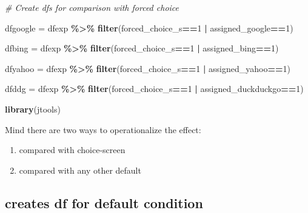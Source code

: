 \documentclass[
  11pt,
]{article}
\newenvironment{Shaded}{\begin{snugshade}}{\end{snugshade}}
\newcommand{\CommentTok}[1]{\textcolor[rgb]{0.56,0.35,0.01}{\textit{#1}}}
\newcommand{\DecValTok}[1]{\textcolor[rgb]{0.00,0.00,0.81}{#1}}
\newcommand{\FunctionTok}[1]{\textcolor[rgb]{0.13,0.29,0.53}{\textbf{#1}}}
\newcommand{\NormalTok}[1]{#1}
\newcommand{\OtherTok}[1]{\textcolor[rgb]{0.56,0.35,0.01}{#1}}
\newcommand{\SpecialCharTok}[1]{\textcolor[rgb]{0.81,0.36,0.00}{\textbf{#1}}}
\begin{document}
\begin{Shaded}
\begin{Highlighting}[]
\CommentTok{\# Create dfs for comparison with forced choice}

\NormalTok{dfgoogle }\OtherTok{=}\NormalTok{ dfexp }\SpecialCharTok{\%\textgreater{}\%} 
  \FunctionTok{filter}\NormalTok{(forced\_choice\_s}\SpecialCharTok{==}\DecValTok{1} \SpecialCharTok{|}\NormalTok{ assigned\_google}\SpecialCharTok{==}\DecValTok{1}\NormalTok{) }

\NormalTok{dfbing }\OtherTok{=}\NormalTok{ dfexp }\SpecialCharTok{\%\textgreater{}\%} 
  \FunctionTok{filter}\NormalTok{(forced\_choice\_s}\SpecialCharTok{==}\DecValTok{1} \SpecialCharTok{|}\NormalTok{ assigned\_bing}\SpecialCharTok{==}\DecValTok{1}\NormalTok{) }

\NormalTok{dfyahoo }\OtherTok{=}\NormalTok{ dfexp }\SpecialCharTok{\%\textgreater{}\%} 
  \FunctionTok{filter}\NormalTok{(forced\_choice\_s}\SpecialCharTok{==}\DecValTok{1} \SpecialCharTok{|}\NormalTok{ assigned\_yahoo}\SpecialCharTok{==}\DecValTok{1}\NormalTok{) }

\NormalTok{dfddg }\OtherTok{=}\NormalTok{ dfexp }\SpecialCharTok{\%\textgreater{}\%} 
  \FunctionTok{filter}\NormalTok{(forced\_choice\_s}\SpecialCharTok{==}\DecValTok{1} \SpecialCharTok{|}\NormalTok{ assigned\_duckduckgo}\SpecialCharTok{==}\DecValTok{1}\NormalTok{) }
\end{Highlighting}
\end{Shaded}

\begin{Shaded}
\begin{Highlighting}[]
\FunctionTok{library}\NormalTok{(jtools)}
\end{Highlighting}
\end{Shaded}

Mind there are two ways to operationalize the effect:

\begin{enumerate}
\def\labelenumi{\arabic{enumi})}
\item
  compared with choice-screen
\item
  compared with any other default
\end{enumerate}

\hypertarget{creates-df-for-default-condition}{%
\subsection{creates df for default condition}\label{creates-df-for-default-condition}}
\end{document}

